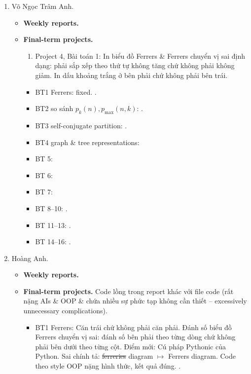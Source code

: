 \documentclass{article}
\begin{document}
\begin{enumerate}
    \item {\sc Võ Ngọc Trâm Anh.}
    \begin{itemize}
        \item {\bf Weekly reports.}
        \item {\bf Final-term projects.}
        \begin{enumerate}
            \item Project 4, Bài toán 1: In biểu đồ Ferrers \& Ferrers chuyển vị sai định dạng: phải sắp xếp theo thứ tự không tăng chứ không phải không giảm. In dấu khoảng trắng ở bên phải chứ không phải bên trái.
        \end{enumerate}
        \begin{itemize}
            \item BT1 Ferrers: fixed. .
            \item BT2 so sánh $p_k(n),p_{\max}(n,k)$: .
            \item BT3 self-conjugate partition: .
            \item BT4 graph \& tree representations:
            \item BT 5:
            \item BT 6:
            \item BT 7:
            \item BT 8--10: .
            \item BT 11--13: .
            \item BT 14--16: .
        \end{itemize}
    \end{itemize}
    \item {\sc Hoàng Anh.}
    \begin{itemize}
        \item {\bf Weekly reports.}
        \item {\bf Final-term projects.} Code lồng trong report khác với file code (rất nặng AIs \& OOP \& chứa nhiều sự phức tạp không cần thiết -- excessively unnecessary complications).
        \begin{itemize}
            \item BT1 Ferrers: Căn trái chứ không phải căn phải. Đánh số biểu đồ Ferrers chuyển vị sai: đánh số bên phải theo từng dòng chứ không phải bên dưới theo từng cột. Điểm mới: Cú pháp Pythonic của Python. Sai chính tả: \st{ferreries} diagram $\mapsto$ Ferrers diagram. Code theo style OOP nặng hình thức, kết quả đúng. .

\end{itemize}
\end{itemize}
\end{enumerate}
\end{document}
